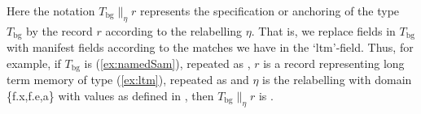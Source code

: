 Here the notation $T_{\mathrm{bg}}\parallel_\eta r$ represents the
specification or anchoring of the type $T_{\mathrm{bg}}$ by the record $r$
according to the relabelling $\eta$.  That is, we replace fields in
$T_{\mathrm{bg}}$ with manifest fields according to the matches we
have in the `ltm'-field.  Thus, for example, if $T_{\mathrm{bg}}$ is
(\ref{ex:namedSam}), repeated as , $r$ is a record
representing long term memory of type (\ref{ex:ltm}), repeated as
 and $\eta$ is the relabelling with domain \{f.x,f.e,a\}
with values as defined in , then
$T_{\mathrm{bg}}\parallel_\eta r$ is .
\begin{ex} 
\begin{subex} 
 
\item {} 
 
\item {}


\end{subex}
\end{ex}
